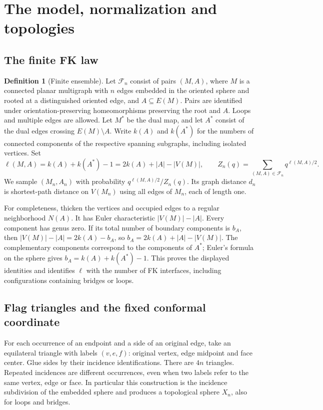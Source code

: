 \documentclass[11pt]{article}
\numberwithin{equation}{section}
\theoremstyle{definition}
\newtheorem{definition}[theorem]{Definition}
\theoremstyle{remark}
\newcommand{\1}{\mathbf 1}
\begin{document}
\section{The model, normalization and topologies}\label{intro:model-section}

\subsection{The finite FK law}

\begin{definition}[Finite ensemble]\label{intro:finite-law}
Let $\mathcal F_n$ consist of pairs $(M,A)$, where $M$ is a connected
planar multigraph with $n$ edges embedded in the oriented sphere and
rooted at a distinguished oriented edge, and $A\subseteq E(M)$.
Pairs are identified under orientation-preserving homeomorphisms
preserving the root and $A$. Loops and multiple edges are allowed.
Let $M^*$ be the dual map, and let $A^*$ consist of the dual edges
crossing $E(M)\setminus A$. Write $k(A)$ and $k(A^*)$ for the numbers
of connected components of the respective spanning subgraphs,
including isolated vertices. Set
\[
 \ell(M,A)=k(A)+k(A^*)-1
         =2k(A)+|A|-|V(M)|,
 \qquad
 Z_n(q)=\sum_{(M,A)\in\mathcal F_n}q^{\ell(M,A)/2}.
\]
We sample $(M_n,A_n)$ with probability
$q^{\ell(M,A)/2}/Z_n(q)$. Its graph distance $d_n$ is shortest-path
distance on $V(M_n)$ using all edges of $M_n$, each of length one.
\end{definition}

For completeness, thicken the vertices and occupied edges to a regular
neighborhood $N(A)$. It has Euler characteristic $|V(M)|-|A|$.
Every component has genus zero. If its total number of boundary
components is $b_A$, then
$|V(M)|-|A|=2k(A)-b_A$, so $b_A=2k(A)+|A|-|V(M)|$.
The complementary components correspond to the components of $A^*$;
Euler's formula on the sphere gives $b_A=k(A)+k(A^*)-1$.
This proves the displayed identities and identifies $\ell$ with the
number of FK interfaces, including configurations containing bridges
or loops.

\subsection{Flag triangles and the fixed conformal coordinate}

For each occurrence of an endpoint and a side of an original edge,
take an equilateral triangle with labels $(v,e,f)$: original vertex,
edge midpoint and face center. Glue sides by their incidence
identifications. There are $4n$ triangles. Repeated incidences are
different occurrences, even when two labels refer to the same vertex,
edge or face. In particular this construction is the incidence
subdivision of the embedded sphere and produces a topological sphere
$X_n$, also for loops and bridges.
\end{document}
